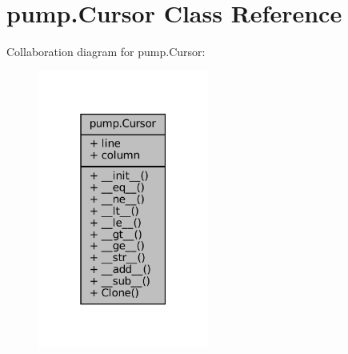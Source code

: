 \hypertarget{classpump_1_1Cursor}{}\section{pump.\+Cursor Class Reference}
\label{classpump_1_1Cursor}


Collaboration diagram for pump.\+Cursor\+:
\nopagebreak
\begin{figure}[H]
\begin{center}
\leavevmode
\includegraphics[width=159pt]{classpump_1_1Cursor__coll__graph}
\end{center}
\end{figure}
